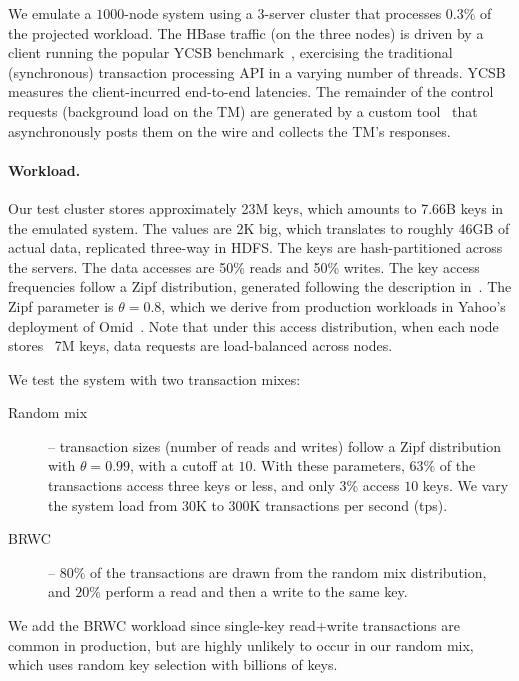 We emulate a $1000$-node system using a $3$-server cluster that processes $0.3\%$ of the projected workload. 
The HBase traffic (on the three nodes) is driven by a client running the popular YCSB benchmark~\cite{Cooper:2010:BCS:1807128.1807152}, 
exercising the traditional (synchronous) transaction processing API in a varying number of threads. YCSB measures the client-incurred end-to-end latencies.
The remainder of the control requests (background load on the TM) are generated by a custom tool~\cite{Omid2017} 
that asynchronously posts them on the wire and collects the TM's responses. 

\paragraph{Workload.}

Our test cluster stores approximately 23M keys, which amounts to 7.66B keys in the emulated system. 
The values are 2K big, which translates to roughly 46GB of actual data, replicated three-way in HDFS. The keys are hash-partitioned
across the servers. The data accesses are 50\% reads and 
50\% writes. The key access frequencies follow a Zipf distribution, generated following 
the description in~\cite{Gray:1994:QGB:191839.191886}. The Zipf parameter is $\theta=0.8$, which we derive from production 
workloads in Yahoo's deployment of Omid~\cite{Omid2017}. 
Note that under this access distribution, when each node stores ~7M keys, data requests are load-balanced across nodes.

We test the system with two transaction mixes:
\begin{description}
\item[Random mix] -- 
transaction sizes (number of reads and writes) follow a Zipf distribution with $\theta=0.99$, with a cutoff at $10$. 
With these parameters, $63\%$ of the transactions access three keys or less, and only $3\%$ access $10$ keys. 
We vary the system load from 30K to 300K transactions per second (tps). 
\item[BRWC] -- $80\%$ of the transactions are drawn from the random mix distribution, and $20\%$ perform a read
and then a write to the same key. 
\end{description}

We add the BRWC workload since single-key read+write transactions are common in production, but are highly unlikely to 
occur in our random mix, which uses random key selection with billions of keys.



